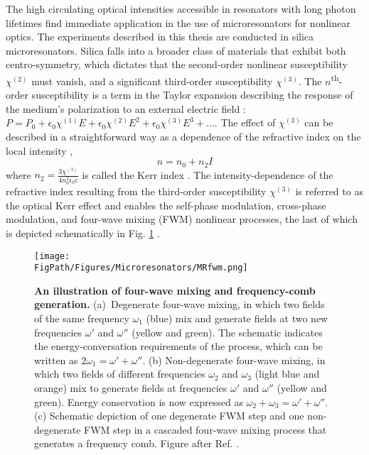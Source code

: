 The high circulating optical intensities accessible in resonators with long photon lifetimes find immediate application in the use of microresonators for nonlinear optics. The experiments described in this thesis are conducted in silica microresonators. Silica falls into a broader class of materials that exhibit both centro-symmetry, which dictates that the second-order nonlinear susceptibility $\chi^{(2)}$ must vanish, and a significant third-order susceptibility $\chi^{(3)}$. The $n$\textsuperscript{th}-order susceptibility is a term in the Taylor expansion describing the response of the medium's polarization to an external electric field \cite{Boyd2003}: $P=P_0+\epsilon_0 \chi^{(1)} E + \epsilon_0 \chi^{(2)} E^2 + \epsilon_0 \chi^{(3)} E^3+...$. The effect of $\chi^{(3)}$ can be described in a straightforward way as a dependence of the refractive index on the local intensity \cite{Agrawal2007},
\begin{equation}
n=n_0+n_2 I \label{eq:KerrIndex}
\end{equation}
where $n_2=\frac{3\chi^{(3)}}{4n_0^2\epsilon_0 c}$ is called the Kerr index \cite{DelCoso2004,Agrawal2007}. The intensity-dependence of the refractive index resulting from the third-order susceptibility $\chi^{(3)}$ is referred to as the optical Kerr effect and enables the self-phase modulation, cross-phase modulation, and four-wave mixing (FWM) nonlinear processes, the last of which is depicted schematically in Fig. \ref{fig:MRfwm} \cite{Boyd2003}. 

\begin{figure}[htpb]
	\begin{center}
		\texttt{[image: \\FigPath/Figures/Microresonators/MRfwm.png]}
	\end{center}
	\caption[An illustration of four-wave mixing and frequency-comb generation.]{\textbf{An illustration of four-wave mixing and frequency-comb generation.} (a)~Degenerate four-wave mixing, in which two fields of the same frequency $\omega_1$ (blue) mix and generate fields at two new frequencies $\omega'$ and $\omega''$ (yellow and green). The schematic indicates the energy-conversation requirements of the process, which can be written as $2\omega_1=\omega'+\omega''$. (b) Non-degenerate four-wave mixing, in which two fields of different frequencies $\omega_2$ and $\omega_3$ (light blue and orange) mix to generate fields at frequencies $\omega'$ and $\omega''$ (yellow and green). Energy conservation is now expressed as $\omega_2+\omega_3=\omega'+\omega''$. (c) Schematic depiction of one degenerate FWM step and one non-degenerate FWM step in a cascaded four-wave mixing process that generates a frequency comb. \footnotesize{Figure after Ref. \cite{Kippenberg2011}.}}
	
	\label{fig:MRfwm}
\end{figure} 


